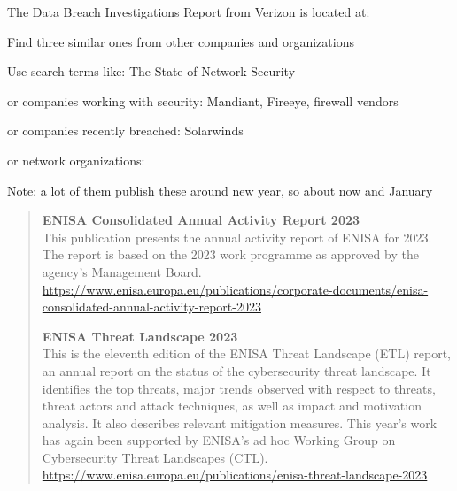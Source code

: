 \documentclass[Screen16to9,17pt]{foils}
\begin{document}


\begin{quote}

\end{quote}

\begin{list2}
\item The Data Breach Investigations Report from Verizon is located at:\\
\item Find three similar ones from other companies and organizations

\item Use search terms like: The State of Network Security
\item or companies working with security: Mandiant, Fireeye, firewall vendors
\item or companies recently breached: Solarwinds
\item or network organizations:
\end{list2}
Note: a lot of them publish these around new year, so about now and January


\begin{quote}
{\bf ENISA Consolidated Annual Activity Report 2023}\\
This publication presents the annual activity report of ENISA for 2023. The report is based on the 2023 work programme as approved by the agency's Management Board.\\
\url{https://www.enisa.europa.eu/publications/corporate-documents/enisa-consolidated-annual-activity-report-2023}

{\bf ENISA Threat Landscape 2023}\\
This is the eleventh edition of the ENISA Threat Landscape (ETL) report, an annual report on the status of the cybersecurity threat landscape. It identifies the top threats, major trends observed with respect to threats, threat actors and attack techniques, as well as impact and motivation analysis. It also describes relevant mitigation measures. This year’s work has again been supported by ENISA’s ad hoc Working Group on Cybersecurity Threat Landscapes (CTL).\\
\url{https://www.enisa.europa.eu/publications/enisa-threat-landscape-2023}
\end{quote}
\end{document}
